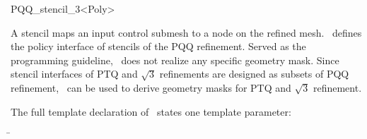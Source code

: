 
\ccRefPageBegin



\begin{ccRefClass}{PQQ_stencil_3<Poly>}

\ccDefinition

A stencil maps an input control submesh to a node on the refined 
mesh. \ccClassTemplateName\ defines the policy interface of 
stencils of the PQQ refinement. Served as the programming guideline,
\ccClassTemplateName\ does not realize any specific geometry mask.
Since stencil interfaces of PTQ and $\sqrt{3}$ refinements are
designed as subsets of PQQ refinement, \ccClassTemplateName\ can 
be used to derive geometry masks for PTQ and $\sqrt{3}$ refinement.




\ccParameters

The full template declaration of \ccClassTemplateName\ states one
template parameter:

\begin{tabbing}
 \= 
\end{tabbing}
   

\end{ccRefClass}

